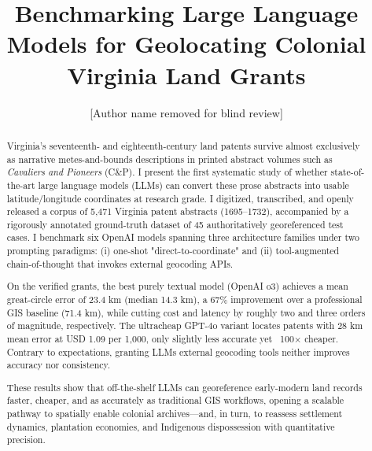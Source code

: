 \documentclass{josis}
\begin{document}
\title{Benchmarking Large Language Models for Geolocating Colonial Virginia Land Grants}
\author{[Author name removed for blind review]}

\maketitle


\begin{abstract}
Virginia's seventeenth- and eighteenth-century land patents survive almost exclusively as narrative metes-and-bounds descriptions in printed abstract volumes such as \emph{Cavaliers and Pioneers} (C\&P). I present the first systematic study of whether state-of-the-art large language models (LLMs) can convert these prose abstracts into usable latitude/longitude coordinates at research grade. I digitized, transcribed, and openly released a corpus of 5,471 Virginia patent abstracts (1695–1732), accompanied by a rigorously annotated ground-truth dataset of 45 authoritatively georeferenced test cases. I benchmark six OpenAI models spanning three architecture families under two prompting paradigms: (i) one-shot "direct-to-coordinate" and (ii) tool-augmented chain-of-thought that invokes external geocoding APIs.

On the verified grants, the best purely textual model (OpenAI o3) achieves a mean great-circle error of 23.4 km (median 14.3 km), a 67\% improvement over a professional GIS baseline (71.4 km), while cutting cost and latency by roughly two and three orders of magnitude, respectively. The ultracheap GPT-4o variant locates patents with 28 km mean error at USD 1.09 per 1,000, only slightly less accurate yet ~100× cheaper. Contrary to expectations, granting LLMs external geocoding tools neither improves accuracy nor consistency.

These results show that off-the-shelf LLMs can georeference early-modern land records faster, cheaper, and as accurately as traditional GIS workflows, opening a scalable pathway to spatially enable colonial archives—and, in turn, to reassess settlement dynamics, plantation economies, and Indigenous dispossession with quantitative precision.
\end{abstract}





\end{document}
